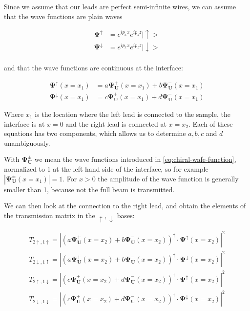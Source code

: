 Since we assume that our leads are perfect semi-infinite wires, we can assume
that the wave functions are plain waves

\begin{align*}
    \mathbf{\Psi^\uparrow}   &=  e^{i p_x x} e^{i p_z z} |\uparrow> \\
    \mathbf{\Psi^\downarrow} &=  e^{i p_x x} e^{i p_z z} |\downarrow> \\
\end{align*}

and that the wave functions are continuous at the interface:

\begin{align*}
    \mathbf{\Psi^\uparrow}(x=x_1) &=
        a \mathbf{\Psi^+_U}(x=x_1) + b  \mathbf{\Psi^-_U}(x=x_1)\\
    \mathbf{\Psi^\downarrow}(x=x_1) &=
        c \mathbf{\Psi^+_U}(x=x_1) + d  \mathbf{\Psi^-_U}(x=x_1)
\end{align*}

Where $x_1$ is the location where the left lead is connected to the sample, the
interface is at $x = 0$ and the right lead is connected at $x = x_2$.
Each of these equations has two components, which allows us to determine
$a, b, c$ and $d$ unambiguously.

With $\mathbf{\Psi^\pm_U}$ we mean the wave functions introduced in
\ref{eq:chiral-wafe-function}, normalized to 1 at the
left hand side of the interface, so for example
$|\mathbf{\Psi^\pm_U}(x=x_1)|=1$. For $x>0$ the amplitude of the wave function
is generally smaller than 1, because not the full beam is transmitted.

We can then look at the connection to the right lead, and obtain the 
elements of the transmission matrix in the $\uparrow, \downarrow$ bases:

\begin{align}
    T_{2\uparrow,1\uparrow} = \left| \left( 
        a \mathbf{\Psi^+_U}(x=x_2) + b  \mathbf{\Psi^-_U}(x=x_2)
    \right)^\dagger \cdot \mathbf{\Psi}^\uparrow(x=x_2) \right|^2\\
    T_{2\downarrow,1\uparrow} = \left| \left( 
        a \mathbf{\Psi^+_U}(x=x_2) + b  \mathbf{\Psi^-_U}(x=x_2)
    \right)^\dagger \cdot \mathbf{\Psi}^\downarrow(x=x_2) \right|^2\\
    T_{2\uparrow,1\downarrow} = \left| \left( 
        c \mathbf{\Psi^+_U}(x=x_2) + d  \mathbf{\Psi^-_U}(x=x_2)
    \right)^\dagger \cdot \mathbf{\Psi}^\uparrow(x=x_2) \right|^2\\
    T_{2\downarrow,1\downarrow} = \left| \left( 
        c \mathbf{\Psi^+_U}(x=x_2) + d  \mathbf{\Psi^-_U}(x=x_2)
    \right)^\dagger \cdot \mathbf{\Psi}^\downarrow(x=x_2) \right|^2
\end{align}

